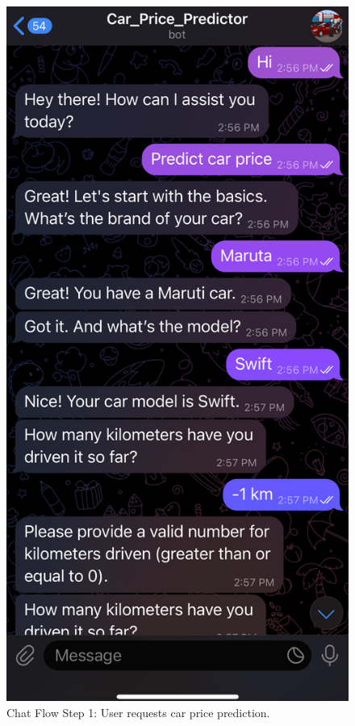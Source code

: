 \documentclass[a4paper,12pt]{article}
\begin{document}
\begin{justify}
\begin{figure}[h!]
	\centering
	\begin{minipage}{0.45\textwidth}
		\centering
		\includegraphics[width=\textwidth]{1.jpg}
		\caption{Chat Flow Step 1: User requests car price prediction.}

\end{minipage}
\end{figure}
\end{justify}
\end{document}
